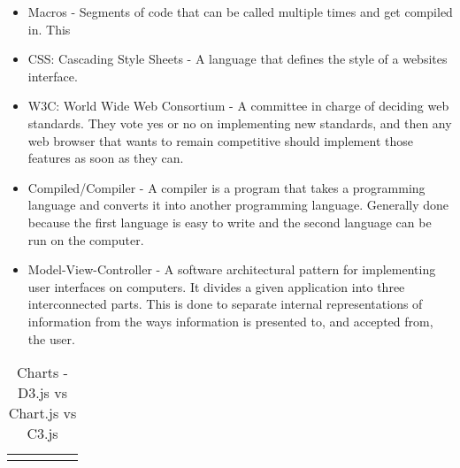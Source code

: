 \documentclass[draftclsnofoot,onecolumn,letterpaper,10pt,compsoc]{IEEEtran}
\begin{document}
  \begin{itemize}
    \item Macros - Segments of code that can be called multiple times and get compiled in. This
    \item CSS: Cascading Style Sheets - A language that defines the style of a websites interface.
    \item W3C: World Wide Web Consortium - A committee in charge of deciding web standards. They vote yes or no on implementing new standards, and then any web browser that wants to remain competitive should implement those features as soon as they can.
    \item Compiled/Compiler - A compiler is a program that takes a programming language and converts it into another programming language. Generally done because the first language is easy to write and the second language can be run on the computer.
    \item Model-View-Controller - A software architectural pattern for implementing user interfaces on computers. It divides a given application into three interconnected parts. This is done to separate internal representations of information from the ways information is presented to, and accepted from, the user.
  \end{itemize}

\begin{landscape}
  \begin{table}[]
  \centering
  \caption{Charts - D3.js vs Chart.js vs C3.js}
  \label{my-label}
    \begin{tabular}{lllll}
      &  &  &  & \\
    \end{tabular}
  \end{table}
\end{landscape}

\clearpage


{}

\end{document}
